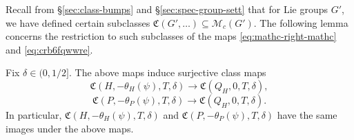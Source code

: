 Recall from \S\ref{sec:class-bumps} and \S\ref{sec:spec-group-sett} that for Lie groups $G'$, we have defined certain subclasses $\mathfrak{C}(G', \dotsc) \subseteq \mathcal{M}_c(G')$.  The following lemma concerns the restriction to such subclasses of the maps \eqref{eq:mathc-right-mathc} and \eqref{eq:crb6fqwwre}.
\begin{lemma}\label{lem:fix-delta-in}
  Fix $\delta \in (0,1/2]$.  The above maps induce surjective class maps
  \begin{equation*}
    \mathfrak{C}(H,-\theta_H(\psi),T,\delta) \rightarrow \mathfrak{C}(Q_H,0,T,\delta),
  \end{equation*}
  \begin{equation*}
    \mathfrak{C}(P,-\theta_P(\psi),T,\delta) \rightarrow \mathfrak{C}(Q_H,0,T,\delta).
  \end{equation*}
  In particular, $\mathfrak{C}(H,-\theta_H(\psi),T,\delta)$ and $\mathfrak{C}(P,-\theta_P(\psi),T,\delta)$ have the same images under the above maps.
\end{lemma}
